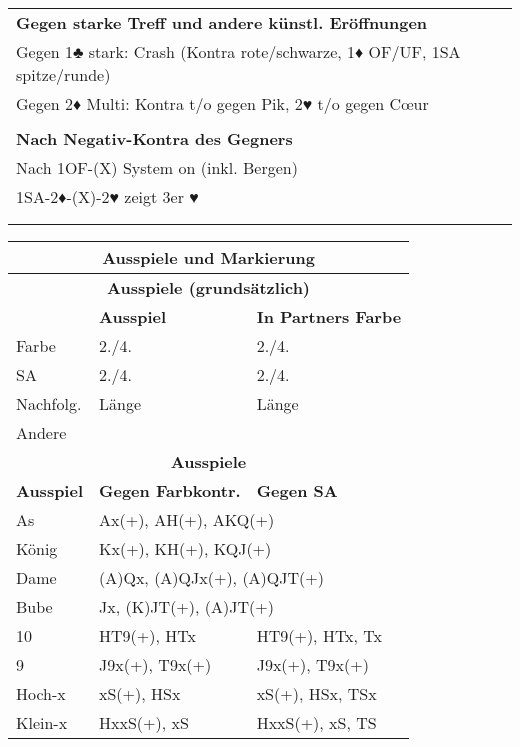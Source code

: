 \documentclass{article}
\begin{document}
\begin{multicols}{3}
\begin{tabularx}{\columnwidth}{|X|}
\\
\\
\hline \bf Gegen starke Treff und andere künstl. Eröffnungen \\
\hline Gegen 1♣ stark: Crash (Kontra rote/schwarze, 1♦ OF/UF, 1SA spitze/runde) \\
Gegen 2♦ Multi: Kontra t/o gegen Pik, 2♥ t/o gegen Cœur\\
\\
\hline \bf Nach Negativ-Kontra des Gegners \\
\hline Nach 1OF-(X) System on (inkl. Bergen) \\
 1SA-2♦-(X)-2♥ zeigt 3er ♥ \\
\\
\\
\hline \end{tabularx}

\begin{tabularx}{\columnwidth}{|l|X|X|}
\hline \multicolumn{3}{|c|}{\bf \large Ausspiele und Markierung} \\

\hline \multicolumn{3}{|c|}{\bf Ausspiele (grundsätzlich)} \\
\hline           & {\bf Ausspiel} & {\bf In Partners Farbe} \\
\hline Farbe     & 2./4. & 2./4. \\
\hline SA        & 2./4. & 2./4. \\
\hline Nachfolg. & Länge & Länge \\
\hline Andere    & \multicolumn{2}{|l|}{} \\

\hline \multicolumn{3}{|c|}{\bf Ausspiele} \\
\hline {\bf Ausspiel} & {\bf Gegen Farbkontr.} & {\bf Gegen SA} \\
\hline As       & \multicolumn{2}{l|}{Ax(+), AH(+), AKQ(+)} \\
\hline König    & \multicolumn{2}{l|}{Kx(+), KH(+), KQJ(+) } \\
\hline Dame     & \multicolumn{2}{l|}{(A)Qx, (A)QJx(+), (A)QJT(+)} \\
\hline Bube     & \multicolumn{2}{l|}{Jx, (K)JT(+), (A)JT(+)} \\
\hline 10       & HT9(+), HTx & HT9(+), HTx, Tx \\
\hline 9        & J9x(+), T9x(+) & J9x(+), T9x(+) \\
\hline Hoch-x   & xS(+), HSx & xS(+), HSx, TSx \\
\hline Klein-x  & HxxS(+), xS & HxxS(+), xS, TS \\
\hline \end{tabularx}


\end{multicols}
\end{document}
